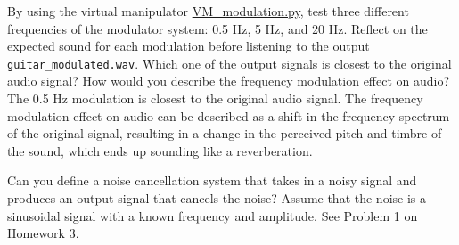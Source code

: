 \documentclass{ee102_notes}
\begin{document}
\begin{popquiz}
  By using the virtual manipulator \href{https://github.com/ee-ucmerced/ee102-signals-systems/blob/main/lecture\_notes/week3\_systems/VM\_modulation.py}{VM\_modulation.py}, test three different frequencies of the modulator system: 0.5 Hz, 5 Hz, and 20 Hz. Reflect on the expected sound for each modulation before listening to the output \texttt{guitar\_modulated.wav}. Which one of the output signals is closest to the original audio signal? How would you describe the frequency modulation effect on audio?
  \popqsplit
  The 0.5 Hz modulation is closest to the original audio signal. The frequency modulation effect on audio can be described as a shift in the frequency spectrum of the original signal, resulting in a change in the perceived pitch and timbre of the sound, which ends up sounding like a reverberation.
\end{popquiz}
\begin{popquiz}
  Can you define a noise cancellation system that takes in a noisy signal and produces an output signal that cancels the noise? Assume that the noise is a sinusoidal signal with a known frequency and amplitude. 
  \popqsplit
  See Problem 1 on Homework 3.
\end{popquiz}
\end{document}

